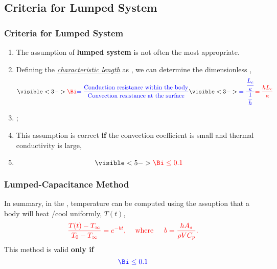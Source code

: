 \documentclass[10pt,compress,handout,unknownkeysallowed]{beamer}
\begin{document}
\subsection{Criteria for Lumped System}


\begin{frame}
 \frametitle{Criteria for Lumped System}
   \begin{enumerate}%
     \item<1-> The assumption of {\bf lumped system} is not often the most appropriate. 
     \item<2-> Defining the \underline{\it characteristic length} as , we can determine the dimensionless ,
       \begin{equation}
          \visible<3->{\red{\Bi} \blue{= \frc{\text{Conduction resistance within the body}}{\text{Convection resistance at the surface}}}} \visible<3->{\blue{= \frc{\frc{L_{c}}{\kappa}}{\frc{1}{h}}} \red{= \frc{h L_{c}}{\kappa}}}
       \end{equation}  
     \item<4-> ;
     \item<4-> This assumption is correct {\bf if} the convection coefficient is small and thermal conductivity is large, \ie
     \item<5->  
                     \begin{displaymath}
                       \visible<5->{ \red{\Bi \leq 0.1}}
                     \end{displaymath}
   \end{enumerate}
\end{frame}

\begin{frame}
 \frametitle{Lumped-Capacitance Method}
    \begin{shaded}
       In summary, in the , temperature can be computed using the assuption that a body will heat /cool uniformly, \ie $T(t)$,
          \begin{displaymath}
             \textcolor{red}{\displaystyle\frac{T(t)-T_{\infty}}{T_{0}-T_{\infty}} = e^{-bt},\;\;\;\text{ where }\;\;\;\ b = \displaystyle\frac{hA_{s}}{\rho V C_{p}}.}
          \end{displaymath}
This method is valid {\bf only if}
           \begin{displaymath}
               \blue{\Bi \le 0.1}
           \end{displaymath}
    \end{shaded}

\end{frame} 
\end{document}
